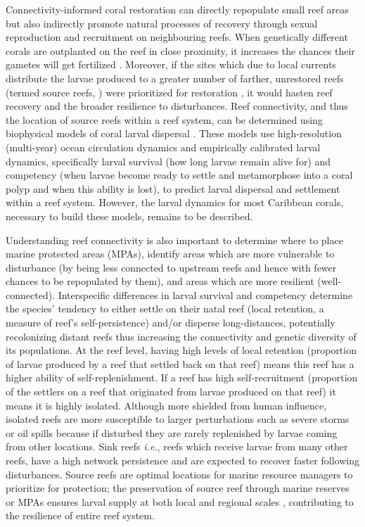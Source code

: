 \documentclass[preprint,12pt,authoryear]{elsarticle}
\begin{document}
	Connectivity-informed coral restoration can directly repopulate small reef areas but also indirectly promote natural processes of recovery through sexual reproduction and recruitment on neighbouring reefs. When genetically different corals are outplanted on the reef in close proximity, it increases the chances their gametes will get fertilized \citep{omori2019coral}. Moreover, if the sites which due to local currents distribute the larvae produced to a greater number of farther, unrestored reefs (termed source reefs, \citealp{bode2018resilient}) were prioritized for restoration \citep{king2023larval}, it would hasten reef recovery and the broader resilience to disturbances. Reef connectivity, and thus the location of source reefs within a reef system, can be determined using biophysical models of coral larval dispersal \citep{frys2020fine, figueiredo2022global,king2023larval}. These models use high-resolution (multi-year) ocean circulation dynamics and empirically calibrated larval dynamics, specifically larval survival (how long larvae remain alive for) and competency (when larvae become ready to settle and metamorphose into a coral polyp and when this ability is lost), to predict larval dispersal and settlement within a reef system. However, the larval dynamics for most Caribbean corals, necessary to build these models, remains to be described.
	
	Understanding reef connectivity is also important to determine where to place marine protected areas (MPAs), identify areas which are more vulnerable to disturbance (by being less connected to upstream reefs and hence with fewer chances to be repopulated by them), and areas which are more resilient (well-connected). Interspecific differences in larval survival and competency determine the species’ tendency to either settle on their natal reef (local retention, a measure of reef’s self-persistence) and/or disperse long-distances, potentially recolonizing distant reefs thus increasing the connectivity and genetic diversity of its populations. At the reef level, having high levels of local retention (proportion of larvae produced by a reef that settled back on that reef) means this reef has a higher ability of self-replenishment. If a reef has high self-recruitment (proportion of the settlers on a reef that originated from larvae produced on that reef) it means it is highly isolated.  Although more shielded from human influence, isolated reefs are more susceptible to larger perturbations such as severe storms or oil spills \citep{baumann2022remoteness} because if disturbed they are rarely replenished by larvae coming from other locations. Sink reefs \textit{i.e.}, reefs which receive larvae from many other reefs, have a high network persistence and are expected to recover faster following disturbances. Source reefs are optimal locations for marine resource managers to prioritize for protection; the preservation of source reef through marine reserves or MPAs ensures larval supply at both local and regional scales \citep{muenzel2023integrating}, contributing to the resilience of entire reef system.
	
\end{document}
